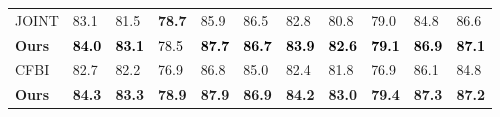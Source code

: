 \documentclass[letterpaper]{article} \usepackage{aaai22}  \usepackage{times}  \usepackage{helvet}  \usepackage{courier}  \usepackage[hyphens]{url}  \usepackage{graphicx} \urlstyle{rm} \def\UrlFont{\rm}  \usepackage{natbib}  \usepackage{caption} \DeclareCaptionStyle{ruled}{labelfont=normalfont,labelsep=colon,strut=off} \frenchspacing  \setlength{\pdfpagewidth}{8.5in}  \setlength{\pdfpageheight}{11in}  \usepackage{algorithm}
\begin{document}
\begin{table*}[ht]
{\begin{tabular}{llllll|lllll}
        JOINT {\cite{mao2021joint}}&    83.1 & 81.5 &\textbf{78.7}&85.9&86.5 & 82.8 & 80.8 &79.0&84.8&86.6     \\
		\textbf{Ours}        &   \textcolor{black}{\textbf{{84.0}}} & \textcolor{black}{\textbf{83.1}} & \textcolor{black}{{78.5}} & \textcolor{black}{\textbf{87.7}}  & \textcolor{black}{\textbf{86.7}} &   \textcolor{black}{\textbf{83.9}} & \textcolor{black}{\textbf{82.6}} & \textcolor{black}{\textbf{79.1}} & \textcolor{black}{\textbf{86.9}}  & \textcolor{black}{\textbf{87.1}}\\
        \midrule
	    CFBI {\cite{yang2020collaborative}}&    82.7 & 82.2  & 76.9 & 86.8  & 85.0  &      82.4 & 81.8 & 76.9 & 86.1  & 84.8   \\	
		\textbf{Ours} &\textbf{84.3} & \textbf{83.3}&\textbf{78.9}&\textbf{87.9} &\textbf{86.9}  & \textbf{84.2} & \textbf{83.0}  & \textbf{79.4} &\textbf{87.3}  &    \textbf{87.2}  \\	
		\bottomrule
	\end{tabular}

    }
	\label{table:ytb}
\end{table*}
\end{document}
